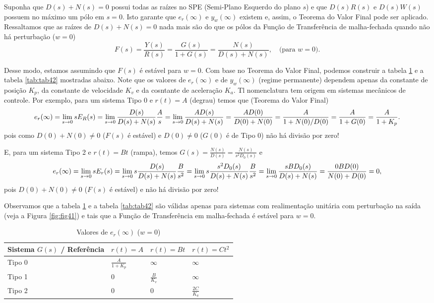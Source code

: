 \documentclass[
]{book}
\theoremstyle{definition}
\theoremstyle{definition}
\theoremstyle{definition}
\theoremstyle{remark}
\begin{document}
Suponha que \(D(s) + N(s) = 0\) possui todas as raízes no SPE (Semi-Plano Esquerdo do plano \(s\)) e que \(D(s)R(s)\) e \(D(s)W(s)\) possuem no máximo um pólo em \(s=0\). Isto garante que \(e_r(\infty)\) e \(y_w(\infty)\) existem e, assim, o Teorema do Valor Final pode ser aplicado. Ressaltamos que as raízes de \(D(s) + N(s) = 0\) nada mais são do que os pólos da Função de Transferência de malha-fechada quando não há perturbação (\(w=0\))
\[
F(s) = \frac {Y(s)}{R(s)} = \frac{G(s)}{1+G(s)} = \frac {N(s)}{D(s)+N(s)}, \quad \text{(para } w=0 \text{).} 
\]

Desse modo, estamos assumindo que \(F(s)\) é estável para \(w=0\). Com base no Teorema do Valor Final, podemos construir a tabela \ref{tab:tab41} e a tabela \ref{tab:tab42} mostradas abaixo. Note que os valores de \(e_r(\infty)\) e de \(y_w(\infty)\) (regime permanente) dependem apenas da constante de posição \(K_p\), da constante de velocidade \(K_v\) e da cosntante de aceleração \(K_a\). Tl nomenclatura tem origem em sistemas mecânicos de controle. Por exemplo, para um sistema Tipo 0 e \(r(t)=A\) (degrau) temos que (Teorema do Valor Final)
\[
e_r(\infty) = \lim\limits_{s \to 0}{sE_R(s)}=\lim\limits_{s\to0}{\frac{D(s)}{D(s)+N(s)}\frac{A}{s}} = \lim\limits_{s\to0}{\frac{AD(s)}{D(s)+N(s)}} \\
= \frac{AD(0)}{D(0) + N(0)} = \frac{A}{1+N(0)/D(0)} = \frac{A}{1+G(0)} = \frac {A}{1+K_p}.
\]
pois como \(D(0) + N(0) \neq 0\) (\(F(s)\) é estável) e \(D(0) \neq 0\) (\(G(0)\) é de Tipo 0) não há divisão por zero!

E, para um sistema Tipo 2 e \(r(t) = Bt\) (rampa), temos \(G(s) = \frac{N(s)}{D(s)} = \frac{N(s)}{s^2D_0(s)}\) e
\[
e_r(\infty) = \lim\limits_{s \to 0}{sE_r(s) = \lim\limits_{s \to 0}{s\frac{D(s)}{D(s)+N(s)}\frac{B}{s^2}}} = \lim\limits_{s \to 0}{s\frac{s^2D_0(s)}{D(s)+N(s)}\frac{B}{s^2}}\\
=\lim\limits_{s \to 0}{\frac{sBD_0(s)}{D(s)+N(s)}}=\frac{0BD(0)}{N(0)+D(0)}=0,
\]
pois \(D(0) + N(0) \neq 0\) (\(F(s)\) é estável) e não há divisão por zero!

Observamos que a tabela \ref{tab:tab41} e a tabela \ref{tab:tab42} são válidas apenas para sistemas com realimentação unitária com perturbação na saída (veja a Figura \ref{fig:fig41}) e tais que a Função de Transferência em malha-fechada é estável para \(w=0\).

\begin{table}

\caption{\label{tab:tab41}Valores de $e_r(\infty)$ ($w=0$)}
\centering
\begin{tabular}[t]{llll}
\toprule
Sistema $G(s)$ / Referência & $r(t)=A$ & $r(t) = Bt$ & $r(t) = Ct^2$\\
\midrule
Tipo 0 & $\frac{A}{1 + K_p}$ & $\infty$ & $\infty$\\
Tipo 1 & 0 & $\frac{B}{K_v}$ & $\infty$\\
Tipo 2 & 0 & 0 & $\frac{2C}{K_a}$\\
\bottomrule
\end{tabular}
\end{table}
\end{document}
